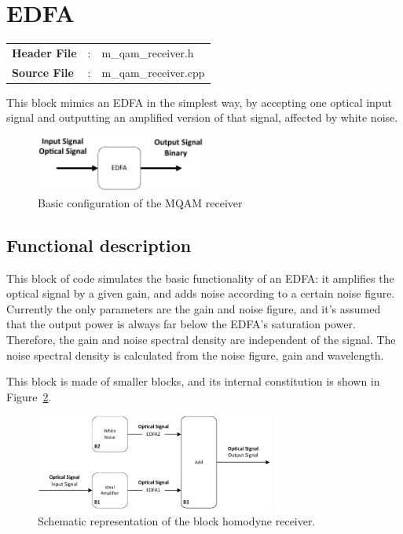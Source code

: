 \clearpage

\section{EDFA}

\begin{tcolorbox}	
	\begin{tabular}{p{2.75cm} p{0.2cm} p{10.5cm}} 	
		\textbf{Header File}   &:& m\_qam\_receiver.h \\
		\textbf{Source File}   &:& m\_qam\_receiver.cpp \\
	\end{tabular}
\end{tcolorbox}

This block mimics  an EDFA in the simplest way, by accepting one optical input 
signal and outputting an amplified version of that signal, affected by white 
noise.

\begin{figure}[h]
	\centering
	\includegraphics[width=0.5\textwidth]{../lib/edfa/figures/edfa_simple}
	\caption{Basic configuration of the MQAM 
	receiver}\label{fig:edfa_simple}
\end{figure}

\subsection*{Functional description}

This block of code simulates the basic functionality of an EDFA: it amplifies 
the optical signal by a given gain, and adds noise according to a certain noise 
figure. Currently the only parameters are the gain and noise figure, and it's 
assumed that the output power is always far below the EDFA's saturation 
power. Therefore, the gain and noise spectral density are independent of the 
signal. The noise spectral density is calculated from the noise 
figure, gain and wavelength.

This block is made of smaller blocks, and its internal constitution is shown in 
Figure~\ref{fig:edfa_blocks}.

\begin{figure}[h]
	\centering
	\includegraphics[width=0.7\textwidth]{../lib/edfa/figures/edfa_blocks}
	\caption{Schematic representation of the block homodyne 
	receiver.}\label{fig:edfa_blocks}
\end{figure}

